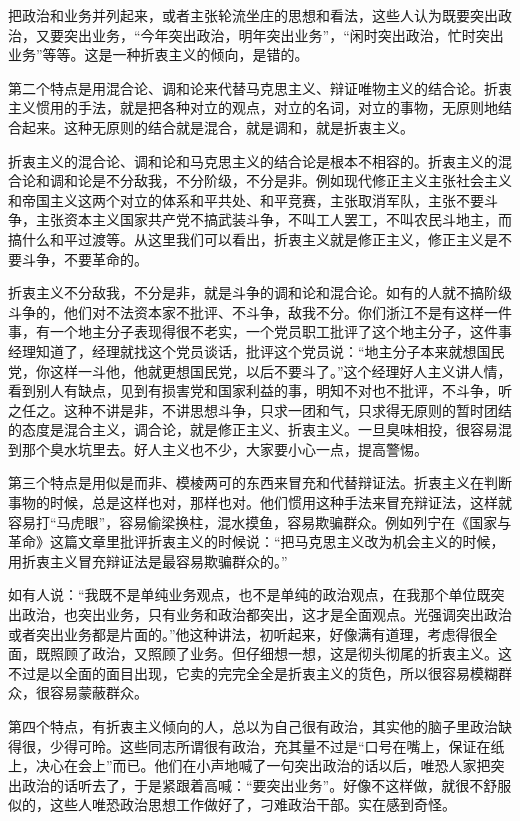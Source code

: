 把政治和业务并列起来，或者主张轮流坐庄的思想和看法，这些人认为既要突出政治，又要突出业务，“今年突出政治，明年突出业务”，“闲时突出政治，忙时突出业务”等等。这是一种折衷主义的倾向，是错的。

第二个特点是用混合论、调和论来代替马克思主义、辩证唯物主义的结合论。折衷主义惯用的手法，就是把各种对立的观点，对立的名词，对立的事物，无原则地结合起来。这种无原则的结合就是混合，就是调和，就是折衷主义。

折衷主义的混合论、调和论和马克思主义的结合论是根本不相容的。折衷主义的混合论和调和论是不分敌我，不分阶级，不分是非。例如现代修正主义主张社会主义和帝国主义这两个对立的体系和平共处、和平竞赛，主张取消军队，主张不要斗争，主张资本主义国家共产党不搞武装斗争，不叫工人罢工，不叫农民斗地主，而搞什么和平过渡等。从这里我们可以看出，折衷主义就是修正主义，修正主义是不要斗争，不要革命的。

折衷主义不分敌我，不分是非，就是斗争的调和论和混合论。如有的人就不搞阶级斗争的，他们对不法资本家不批评、不斗争，敌我不分。你们浙江不是有这样一件事，有一个地主分子表现得很不老实，一个党员职工批评了这个地主分子，这件事经理知道了，经理就找这个党员谈话，批评这个党员说：“地主分子本来就想国民党，你这样一斗他，他就更想国民党，以后不要斗了。”这个经理好人主义讲人情，看到别人有缺点，见到有损害党和国家利益的事，明知不对也不批评，不斗争，听之任之。这种不讲是非，不讲思想斗争，只求一团和气，只求得无原则的暂时团结的态度是混合主义，调合论，就是修正主义、折衷主义。一旦臭味相投，很容易混到那个臭水坑里去。好人主义也不少，大家要小心一点，提高警惕。

第三个特点是用似是而非、模棱两可的东西来冒充和代替辩证法。折衷主义在判断事物的时候，总是这样也对，那样也对。他们惯用这种手法来冒充辩证法，这样就容易打“马虎眼”，容易偷梁换柱，混水摸鱼，容易欺骗群众。例如列宁在《国家与革命》这篇文章里批评折衷主义的时候说：“把马克思主义改为机会主义的时候，用折衷主义冒充辩证法是最容易欺骗群众的。”

如有人说：“我既不是单纯业务观点，也不是单纯的政治观点，在我那个单位既突出政治，也突出业务，只有业务和政治都突出，这才是全面观点。光强调突出政治或者突出业务都是片面的。”他这种讲法，初听起来，好像满有道理，考虑得很全面，既照顾了政治，又照顾了业务。但仔细想一想，这是彻头彻尾的折衷主义。这不过是以全面的面目出现，它卖的完完全全是折衷主义的货色，所以很容易模糊群众，很容易蒙蔽群众。

第四个特点，有折衷主义倾向的人，总以为自己很有政治，其实他的脑子里政治缺得很，少得可昤。这些同志所谓很有政治，充其量不过是“口号在嘴上，保证在纸上，决心在会上”而已。他们在小声地喊了一句突出政治的话以后，唯恐人家把突出政治的话听去了，于是紧跟着高喊：“要突出业务”。好像不这样做，就很不舒服似的，这些人唯恐政治思想工作做好了，刁难政治干部。实在感到奇怪。

